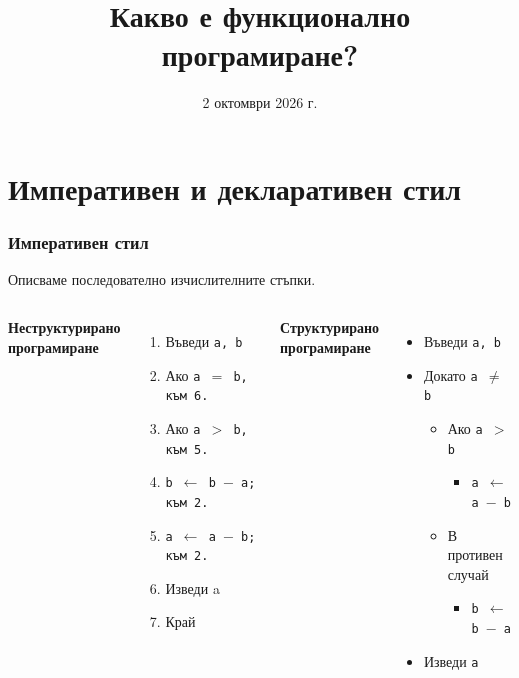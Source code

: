 \documentclass[alsotrans,beameroptions={aspectratio=169}]{beamerswitch}
\title[Какво е ФП?]{Какво е функционално програмиране?}
\date{2 октомври 2026 г.}
\begin{document}
\begin{frame}
  \titlepage
\end{frame}

\section*{Императивен и декларативен стил}

\begin{frame}
  \frametitle{Императивен стил}

  Описваме последователно изчислителните стъпки.\\[2ex]
  \begin{columns}[t,onlytextwidth]

    \textbf{Неструктурирано\\програмиране}\\[2ex]
    \begin{enumerate}
    \item Въведи \tt a, \tt b
    \item Ако \tt{a $=$ b}, към 6.
    \item Ако \tt{a $>$ b}, към 5.
    \item \tt{b $\leftarrow$ b $-$ a}; към 2.
    \item \tt{a $\leftarrow$ a $-$ b}; към 2.
    \item Изведи a
    \item Край
    \end{enumerate}

    \textbf{Структурирано\\програмиране}\\[2ex]
    \begin{itemize}
    \item Въведи \tt a, \tt b
    \item Докато \tt{a $\neq$ b}
      \begin{itemize}
      \item Ако \tt{a $>$ b}
        \begin{itemize}
        \item \tt{a $\leftarrow$ a $-$ b}
        \end{itemize}
      \item В противен случай
        \begin{itemize}
        \item \tt{b $\leftarrow$ b $-$ a}
        \end{itemize}
      \end{itemize}
    \item Изведи \tt a
    \end{itemize}

  \end{columns}
\end{frame}
\end{document}
